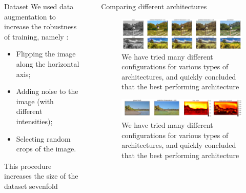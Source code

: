 \documentclass[final]{beamer}
\newlength{\sepwid}
\newlength{\onecolwid}
\newlength{\twocolwid}
\begin{document}
\begin{frame}[t]
\begin{columns}[t]
\begin{column}{\onecolwid}
\begin{block}{Dataset}
We used data augmentation to increase the robustness of training, namely : 
\begin{itemize}
\item Flipping the image along the horizontal axis;
\item Adding noise to the image (with different intensities);
\item Selecting random crops of the image.
\end{itemize}
This procedure increases the size of the dataset sevenfold
\end{block}



\end{column} %




\begin{column}{\sepwid}\end{column} %


\begin{column}{\twocolwid} %

  \begin{block}{Comparing different architectures}

  \begin{figure}
  \begin{center}
  \includegraphics[width=.8\twocolwid]{img/good_cropped.png}
  \caption{We have tried many different configurations for various types of architectures, and quickly concluded that the best performing architecture}
  \label{good}
  \end{center}
  \end{figure}



  \begin{figure}
  \begin{center}
  \includegraphics[width=.8\twocolwid]{img/confidence}
  \caption{We have tried many different configurations for various types of architectures, and quickly concluded that the best performing architecture}
  \label{good}
  \end{center}
  \end{figure}



\end{block}
\end{column}
\end{columns}
\end{frame}
\end{document}

